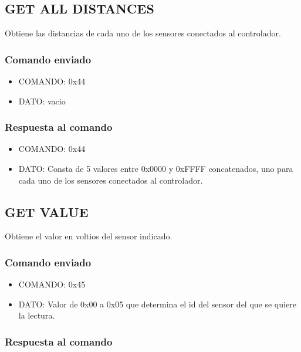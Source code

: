 \documentclass[a4paper,10pt]{article}
\begin{document}
\subsection{GET ALL DISTANCES}
\label{get_all_distances_ds}

Obtiene las distancias de cada uno de los sensores conectados al controlador.

\subsubsection*{Comando enviado}

\begin{itemize}
	\item{COMANDO:} 0x44
	\item{DATO:} vacio
\end{itemize}

\subsubsection*{Respuesta al comando}

\begin{itemize}
	\item{COMANDO:} 0x44
	\item{DATO:} Consta de 5 valores entre 0x0000 y 0xFFFF concatenados, uno para cada uno de los sensores conectados al controlador.
\end{itemize}

\subsection{GET VALUE}
\label{get_value_ds}

Obtiene el valor en voltios del sensor indicado.

\subsubsection*{Comando enviado}

\begin{itemize}
	\item{COMANDO:} 0x45
	\item{DATO:} Valor de 0x00 a 0x05 que determina el id del sensor del que se quiere la lectura.
\end{itemize}

\subsubsection*{Respuesta al comando}
\end{document}
